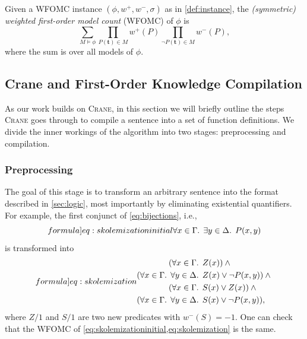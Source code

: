 \documentclass[a4paper,UKenglish,cleveref, autoref, thm-restate]{lipics-v2021}
\begin{document}
\begin{definition}
  Given a WFOMC instance $(\phi, w^{+}, w^{-}, \sigma)$ as in
  \cref{def:instance}, the \emph{(symmetric) weighted first-order model count}
  (WFOMC) of $\phi$ is
  \begin{equation}\label{eq:wfomc}
    \sum_{M \models \phi} \prod_{P(\mathbf{t}) \in M} w^{+}(P) \prod_{\neg P(\mathbf{t}) \in M} w^{-}(P),
  \end{equation}
  where the sum is over all models of $\phi$.
\end{definition}

\subsection{Crane and First-Order Knowledge Compilation}\label{sec:crane}

As our work builds on \textsc{Crane}, in this section we will briefly outline
the steps \textsc{Crane} goes through to compile a sentence into a set of
function definitions. We divide the inner workings of the algorithm into two
stages: preprocessing and compilation.

\subsubsection{Preprocessing}

The goal of this stage is to transform an arbitrary sentence into the format
described in \cref{sec:logic}, most importantly by eliminating existential
quantifiers. For example, the first conjunct of \cref{eq:bijections}, i.e.,
\begin{equation}\label[formula]{eq:skolemizationinitial}
  \forall x \in \Gamma\text{. }\exists y \in \Delta\text{. } P(x, y)
\end{equation}
is transformed into
\begin{equation}\label[formula]{eq:skolemization}
  \begin{aligned}
    (\forall x \in \Gamma\text{. } &Z(x))\land{}\\
    (\forall x \in \Gamma\text{. } \forall y \in \Delta\text{. } &Z(x) \lor \neg P(x, y))\land{}\\
    (\forall x \in \Gamma\text{. } &S(x) \lor Z(x))\land{}\\
    (\forall x \in \Gamma\text{. } \forall y \in \Delta\text{. } &S(x) \lor \neg P(x, y)),
  \end{aligned}
\end{equation}
where $Z/1$ and $S/1$ are two new predicates with $w^{-}(S) = -1$. One can check
that the WFOMC of \cref{eq:skolemizationinitial,eq:skolemization} is the same.
\end{document}
